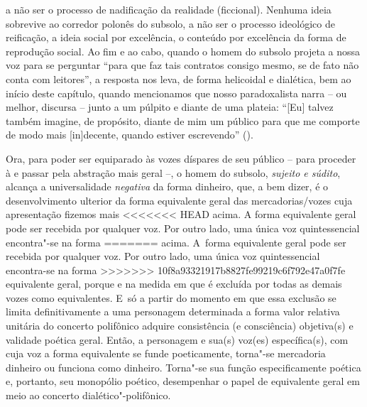 {a não ser o processo de nadificação da realidade (ficcional). Nenhuma
ideia sobrevive ao corredor polonês do subsolo, a não ser o processo
ideológico de reificação, a ideia social por excelência, o conteúdo por
excelência da forma de reprodução social. Ao fim e ao cabo, quando o
homem do subsolo projeta a nossa voz para se perguntar ``para que faz
tais contratos consigo mesmo, se de fato não conta com leitores'', a
resposta nos leva, de forma helicoidal e dialética, bem ao início deste
capítulo, quando mencionamos que nosso paradoxalista narra -- ou melhor,
discursa -- junto a um púlpito e diante de uma plateia: ``{[}Eu{]}
talvez também imagine, de propósito, diante de mim um público para que
me comporte de modo mais {[}in{]}decente, quando estiver escrevendo''
().

Ora, para poder ser equiparado às vozes díspares de seu público -- para
proceder à e passar pela abstração mais geral --, o homem do subsolo,
\emph{sujeito e súdito}, alcança a universalidade \emph{negativa} da
forma dinheiro, que, a bem dizer, é o desenvolvimento ulterior da forma
equivalente geral das mercadorias/vozes cuja apresentação fizemos mais
<<<<<<< HEAD
acima. A forma equivalente geral pode ser recebida por qualquer voz. Por
outro lado, uma única voz quintessencial encontra"-se na forma
=======
acima. A~forma equivalente geral pode ser recebida por qualquer voz. Por
outro lado, uma única voz quintessencial encontra-se na forma
>>>>>>> 10f8a93321917b8827fe99219c6f792e47a0f7fe
equivalente geral, porque e na medida em que é excluída por todas as
demais vozes como equivalentes. E~só a partir do momento em que essa
exclusão se limita definitivamente a uma personagem determinada a forma
valor relativa unitária do concerto polifônico adquire consistência (e
consciência) objetiva(s) e validade poética geral. Então, a personagem e
sua(s) voz(es) específica(s), com cuja voz a forma equivalente se funde
poeticamente, torna"-se mercadoria dinheiro ou funciona como dinheiro.
Torna"-se sua função especificamente poética e, portanto, seu monopólio
poético, desempenhar o papel de equivalente geral em meio ao concerto
dialético"-polifônico.

}
